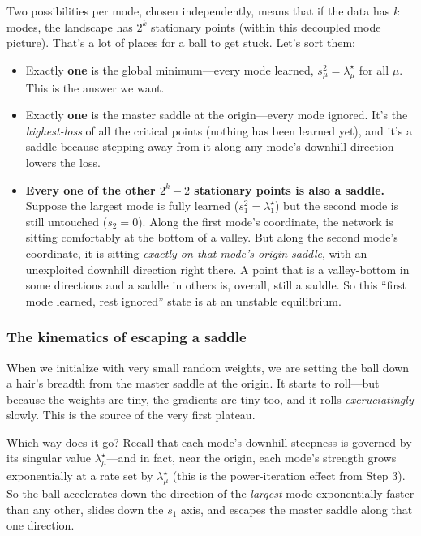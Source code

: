 Two possibilities per mode, chosen independently, means that if the data has $k$
modes, the landscape has $2^k$ stationary points (within this decoupled mode
picture). That's a lot of places for a ball to get stuck. Let's sort them:
\begin{itemize}
    \item Exactly \textbf{one} is the global minimum---every mode learned,
    $s_\mu^2 = \lambda^\star_\mu$ for all $\mu$. This is the answer we want.
    \item Exactly \textbf{one} is the master saddle at the origin---every mode
    ignored. It's the \emph{highest-loss} of all the critical points (nothing has
    been learned yet), and it's a saddle because stepping away from it along any mode's downhill direction lowers the loss.
    \item \textbf{Every one of the other $2^k - 2$ stationary points is also a
    saddle.} Suppose the largest mode is fully learned
    ($s_1^2 = \lambda^\star_1$) but the second mode is still untouched
    ($s_2 = 0$). Along the first mode's coordinate, the network is sitting
    comfortably at the bottom of a valley. But along the second mode's
    coordinate, it is sitting \emph{exactly on that mode's origin-saddle}, with an
    unexploited downhill direction right there. A point that is a valley-bottom in
    some directions and a saddle in others is, overall, still a saddle. So this
    ``first mode learned, rest ignored'' state is at an
    unstable equilibrium.
\end{itemize}

\subsubsection*{The kinematics of escaping a saddle}

When we initialize with
very small random weights, we are setting the ball down a hair's breadth from the
master saddle at the origin. It starts to roll---but because the weights are tiny,
the gradients are tiny too, and it rolls \emph{excruciatingly} slowly. This is the
source of the very first plateau.

Which way does it go? Recall that each mode's downhill steepness is
governed by its singular value $\lambda^\star_\mu$---and in fact, near the origin,
each mode's strength grows exponentially at a rate set by $\lambda^\star_\mu$
(this is the power-iteration effect from Step 3). So the ball accelerates down the direction
of the \emph{largest} mode exponentially faster than any other, slides down the
$s_1$ axis, and escapes the master saddle along that one direction.

